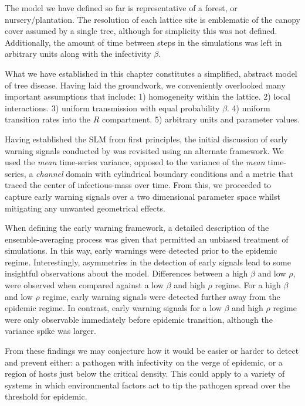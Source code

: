 The model we have defined %
so far is representative of a forest, or nursery/plantation. %
The resolution of each lattice site is emblematic of the canopy cover assumed by a single tree, %
although for simplicity this was not defined. %
Additionally, the amount of time between steps in the simulations was left in arbitrary units %
along with the infectivity $\beta$. %

What we have established in this chapter constitutes a simplified, abstract model of tree %
disease. Having laid the groundwork, we conveniently overlooked many important assumptions %
that include: 1) homogeneity within the lattice. 2) local interactions. 3) uniform %
transmission with equal probability $\beta$. 4) uniform transition rates into the $R$ compartment. %
5) arbitrary units and parameter values.  %

Having established the SLM from first principles, the initial discussion of early warning %
signals conducted by \cite{OROZCOFUENTES201912} was revisited using an alternate framework. %
% 
We used the \textit{mean} time-series variance, opposed to the variance of the \textit{mean} %
time-series, a \textit{channel} domain with cylindrical boundary conditions and a metric that %
traced the center of infectious-mass over time. From this, we proceeded to capture early warning %
signals over a two dimensional parameter space whilst mitigating any unwanted geometrical effects. %

When %
defining the early warning framework, a detailed description of the ensemble-averaging process %
was given that permitted an unbiased treatment of simulations. %
In this way, early warnings %
were detected prior to the epidemic regime. Interestingly, asymmetries %
in the detection of early %
 signals lead to some insightful observations about the model. %
 Differences between a high $\beta$ and low $\rho$, were observed when compared against a low $\beta$ %
 and high $\rho$ regime. For a high $\beta$ and low $\rho$ regime, early warning signals were detected %
 further away from the epidemic regime. %
 In contrast, early warning signals for a low $\beta$ and high $\rho$ regime were only %
 observable immediately before epidemic transition, although the variance spike was larger. %

From these findings we may conjecture how it would be easier or harder to detect and prevent %
either: a pathogen with infectivity on the verge of epidemic, or a region of hosts just below %
the critical density. %
This could apply to a variety of systems in which environmental factors act to tip the pathogen %
spread over the threshold for epidemic. %


